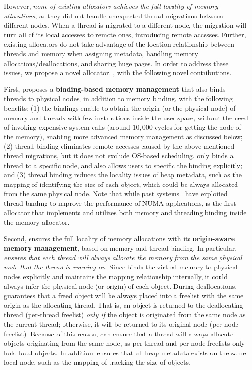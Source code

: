 However, \textit{none of existing allocators achieves the full locality of memory allocations}, as they did not handle unexpected thread migrations between different nodes. When a thread is migrated to a different node, the migration will turn all of its local accesses to remote ones, introducing remote accesses. Further, existing allocators do not take advantage of the location relationship between threads and memory when assigning metadata, handling memory allocations/deallocations, and sharing huge pages. In order to address these issues, we propose a novel allocator, \NM{}, with the following novel contributions.  


First, \NM{} proposes a \textbf{binding-based memory management} that also binds threads to physical nodes, in addition to memory binding, with the following benefits: (1) the bindings enable \NM{} to obtain the origin (or the physical node) of memory and threads with few instructions inside the user space, without the need of invoking expensive system calls (around  $10,000$ cycles for getting the node of the memory), enabling more advanced memory management as discussed below; %
(2) thread binding eliminates remote accesses caused by the above-mentioned thread migrations, but it does not exclude OS-based scheduling. \NM{} only binds a thread to a specific node, and also allows users to specific the binding explicitly; and (3) thread binding reduces the locality issues of heap metadata, such as the mapping of identifying the size of each object, which could be always allocated from the same physical node. Note that while past systems~\cite{li2013numa, XuNuma, Lepers:2015:TMP:2813767.2813788} have exploited thread binding to improve the performance of NUMA applications, \NM{} is the first allocator that implements and utilizes both memory and threading binding inside the memory allocator. 

Second, \NM{} ensures the full locality of memory allocations with its \textbf{origin-aware memory management}, based on memory and thread binding. In particular, \textit{\NM{} ensures that each thread will always allocate the memory from the same physical node that the thread is running on}. Since \NM{} binds the virtual memory to physical nodes explicitly and maintains the mapping relationship internally, it could always infer the physical node (or origin) of each object. During deallocations, \NM{} guarantees that a freed object will be always placed into a freelist with the same origin as the allocating thread. That is, an object is returned to the deallocating thread (per-thread freelist) \textit{only if} the object is originated from the same node as the current thread; otherwise, it will be returned to its original node (per-node freelist). Because of this reason, \NM{} can ensure that a thread will always allocate objects originating from the same node, as per-thread and per-node freelists only hold local objects. In addition, \NM{} ensures that all heap metadata exists on the same local node, such as the mapping of tracking the size of objects.




